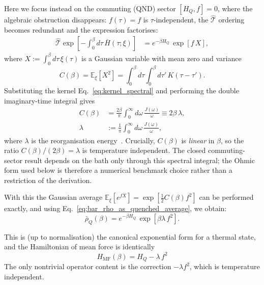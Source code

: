 Here we focus instead on the commuting (QND) sector $[H_Q,f]=0$, where the algebraic obstruction disappears: $f(\tau)=f$ is $\tau$-independent, the $\hat{\mathcal{T}}$ ordering becomes redundant and the expression factorises:
\begin{align}
    \hat{\mathcal{T}}\exp\!\left[-\int_0^\beta d\tau\,\bar{H}(\tau;\xi)\right]
    &=
    e^{-\beta H_Q}\, \exp\!\left[f\,X\right],
    \label{eq:tilde_rho_commuting_factorised}
\end{align}
where $X:=\int_0^\beta d\tau\,\xi(\tau)$ is a Gaussian variable with mean zero and variance
\begin{equation}
    C(\beta) = \mathbb E_\xi[X^2] = \int_0^\beta d\tau\int_0^\beta d\tau'\,K(\tau-\tau').
    \label{eq:Cbeta_def}
\end{equation}
Substituting the kernel Eq.~\eqref{eq:kernel_spectral} and performing the double
imaginary-time integral gives
\begin{align}
    C(\beta)
    &=\frac{2\beta}{\pi}\int_0^\infty d\omega\,\frac{J(\omega)}{\omega}
    \equiv 2\beta\,\lambda,
    \nonumber\\
    \lambda&:=\frac{1}{\pi}\int_0^\infty d\omega\,\frac{J(\omega)}{\omega},
    \label{eq:Cbeta_explicit}
\end{align}
where $\lambda$ is the reorganisation energy~\cite{weissQuantumDissipativeSystems2012, leggettDynamicsDissipativeTwostate1987}.
Crucially, $C(\beta)$ is \emph{linear} in $\beta$, so the ratio $C(\beta)/(2\beta)=\lambda$ is temperature independent. The closed commuting-sector result depends on the bath only through this spectral integral; the Ohmic form used below is therefore a numerical benchmark choice rather than a restriction of the derivation.

With this the Gaussian average $\mathbb E_\xi[e^{f X}] = \exp[\frac{1}{2}C(\beta)f^2]$ can be performed exactly, and using Eq.~\eqref{eq:bar_rho_as_quenched_average}, we obtain:
\begin{equation}
    \bar\rho_Q(\beta) = e^{-\beta H_Q}\,\exp\!\left[\beta\lambda\,f^2\right].
    \label{eq:bar_rho_commuting_closed}
\end{equation}

This is (up to normalisation) the canonical exponential form for a thermal state, and the Hamiltonian of mean force is identically
\begin{equation}
    H_{\mathrm{MF}}(\beta) = H_Q -\lambda\,f^2 
    \label{eq:HMF_commuting_final}
\end{equation}
The only nontrivial operator content is the correction $-\lambda f^2$, which is temperature independent.


